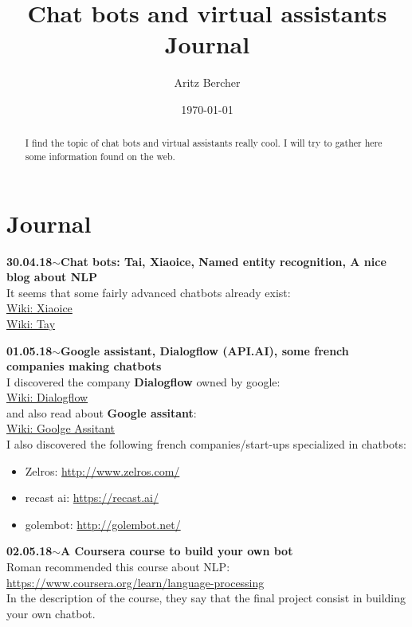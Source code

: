 \documentclass[11pt,a4paper]{article}
\title{Chat bots and virtual assistants\\ Journal}
\author{Aritz Bercher}
\date{\today}
\newenvironment{loggentry}[2]%
{\noindent\textbf{#1}\hspace{1cm}$\mathbf{\sim}$\text{ }\textbf{#2}\\}{\vspace{0.5cm}}
\begin{document}
\maketitle

\begin{abstract}
I find the topic of chat bots and virtual assistants really cool. I will try to gather here some information found on the web.
\end{abstract}

\section{Journal}

\begin{loggentry}{30.04.18}{Chat bots: Tai, Xiaoice, Named entity recognition, A nice blog about NLP}
It seems that some fairly advanced chatbots already exist:\\
\href{https://en.wikipedia.org/wiki/Xiaoice}{Wiki: Xiaoice}\\
\href{https://en.wikipedia.org/wiki/Tay_(bot)}{Wiki: Tay}\\
\end{loggentry}

\begin{loggentry}{01.05.18}{Google assistant, Dialogflow (API.AI), some french companies making chatbots}
I discovered the company \textbf{Dialogflow} owned by google:\\
\href{https://en.wikipedia.org/wiki/Dialogflow}{Wiki: Dialogflow}\\
and also read about \textbf{Google assitant}:\\
\href{https://en.wikipedia.org/wiki/Google_Assistant}{Wiki: Goolge Assitant}\\
I also discovered the following french companies/start-ups specialized in chatbots:\\
\begin{itemize}
\item Zelros: \url{http://www.zelros.com/}
\item recast ai: \url{https://recast.ai/}
\item golembot: \url{http://golembot.net/}
\end{itemize}
\end{loggentry}

\begin{loggentry}{02.05.18}{A Coursera course to build your own bot}
Roman recommended this course about NLP:\\
\url{https://www.coursera.org/learn/language-processing}\\
In the description of the course, they say that the final project consist in building your own chatbot.
\end{loggentry}
\end{document}
